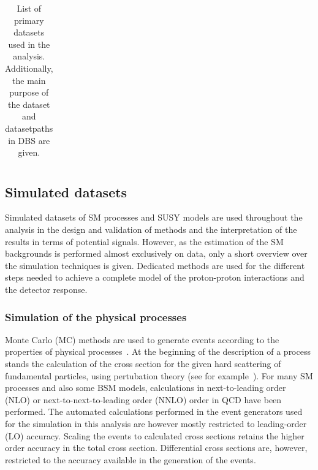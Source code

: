 \begin{table}
\begin{center}
\begin{tabular}{c|c|c}
\end{tabular}


\caption{List of primary datasets used in the analysis. Additionally, the main purpose of the dataset and datasetpaths in DBS are given.}
\label{tab:datasets}
\end{center}
\end{table}



\subsection{Simulated datasets}
\label{sec:MCGen}
Simulated datasets of SM processes and SUSY models are used throughout the analysis in the design and validation of methods and the interpretation of the results in terms of potential signals. However, as the estimation of the SM backgrounds is performed almost exclusively on data, only a short overview over the simulation techniques is given. Dedicated methods are used for the different steps needed to achieve a complete model of the proton-proton interactions and the detector response. 
\subsubsection{Simulation of the physical processes}
Monte Carlo (MC) methods are used to generate events according to the properties of physical processes~\cite{PDG}.
At the beginning of the description of a process stands the calculation of the cross section for the given hard scattering of fundamental particles, using pertubation theory (see for example~\cite{HalzenMartin}). For many SM processes and also some BSM models, calculations in next-to-leading order (NLO) or next-to-next-to-leading order (NNLO) order in QCD have been performed. The automated calculations performed in the event generators used for the simulation in this analysis are however mostly restricted to leading-order (LO) accuracy. Scaling the events to calculated cross sections retains the higher order accuracy in the total cross section. Differential cross sections are, however, restricted to the accuracy available in the generation of the events.  

